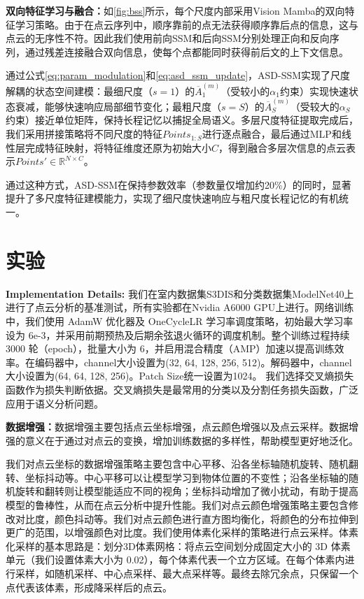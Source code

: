 \documentclass[preprint,12pt]{elsarticle}
\begin{document}
\textbf{双向特征学习与融合：}如\cref{fig:bss}所示，每个尺度内部采用Vision Mamba\cite{VisionMamba}的双向特征学习策略。由于在点云序列中，顺序靠前的点无法获得顺序靠后点的信息，这与点云的无序性不符。因此我们使用前向SSM和后向SSM分别处理正向和反向序列，通过残差连接融合双向信息，使每个点都能同时获得前后文的上下文信息。

通过公式\ref{eq:param_modulation}和\ref{eq:asd_ssm_update}，ASD-SSM实现了尺度解耦的状态空间建模：最细尺度（$s=1$）的$\overline{A}_1^{(m)}$（受较小的$\alpha_1$约束）实现快速状态衰减，能够快速响应局部细节变化；最粗尺度（$s=S$）的$\overline{A}_S^{(m)}$（受较大的$\alpha_S$约束）接近单位矩阵，保持长程记忆以捕捉全局语义。多层尺度特征提取完成后，我们采用拼接策略将不同尺度的特征$Points_{1:S}$进行逐点融合，最后通过MLP和线性层完成特征映射，将特征维度还原为初始大小$C$，得到融合多层次信息的点云表示$Points'\in\mathbb{R}^{N\times C}$。

通过这种方式，ASD-SSM在保持参数效率（参数量仅增加约20\%）的同时，显著提升了多尺度特征建模能力，实现了细尺度快速响应与粗尺度长程记忆的有机统一。

\section{实验}
\textbf{Implementation Details:}
我们在室内数据集S3DIS和分类数据集ModelNet40上进行了点云分析的基准测试，所有实验都在Nvidia A6000 GPU上进行。网络训练中，我们使用 AdamW 优化器及 OneCycleLR 学习率调度策略，初始最大学习率设为 6e-3，并采用前期预热及后期余弦退火循环的调度机制。整个训练过程持续 3000 轮（epoch），批量大小为 6，并启用混合精度（AMP）加速以提高训练效率。在编码器中，channel大小设置为(32, 64, 128, 256, 512)。解码器中，channel大小设置为(64, 64, 128, 256)。Patch Size统一设置为1024。
我们选择交叉熵损失函数作为损失判断依据。交叉熵损失是最常用的分类以及分割任务损失函数，广泛应用于语义分析问题。

\textbf{数据增强：}数据增强主要包括点云坐标增强，点云颜色增强以及点云采样。数据增强的意义在于通过对点云的变换，增加训练数据的多样性，帮助模型更好地泛化。

我们对点云坐标的数据增强策略主要包含中心平移、沿各坐标轴随机旋转、随机翻转、坐标抖动等。中心平移可以让模型学习到物体位置的不变性；沿各坐标轴的随机旋转和翻转则让模型能适应不同的视角；坐标抖动增加了微小扰动，有助于提高模型的鲁棒性，从而在点云分析中提升性能。我们对点云颜色增强策略主要包含修改对比度，颜色抖动等。我们对点云颜色进行直方图均衡化，将颜色的分布拉伸到更广的范围，以增强颜色对比度。我们使用体素化采样的策略进行点云采样。体素化采样的基本思路是：划分3D体素网格：将点云空间划分成固定大小的 3D 体素单元（我们设置体素大小为 0.02），每个体素代表一个立方区域。在每个体素内进行采样，如随机采样、中心点采样、最大点采样等。最终去除冗余点，只保留一个点代表该体素，形成降采样后的点云。
\end{document}

